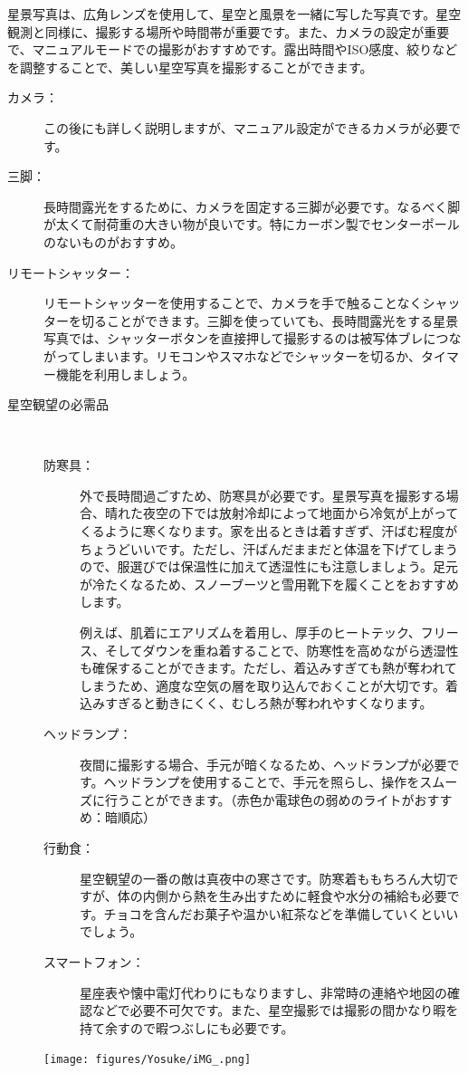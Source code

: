 \documentclass[../../super_nova_2023]{subfiles}
\begin{document}
星景写真は、広角レンズを使用して、星空と風景を一緒に写した写真です。星空観測と同様に、撮影する場所や時間帯が重要です。また、カメラの設定が重要で、マニュアルモードでの撮影がおすすめです。露出時間やISO感度、絞りなどを調整することで、美しい星空写真を撮影することができます。

\begin{tcolorbox}[title=星景写真に必要な物, breakable]
	\begin{description}
		\item[カメラ：]この後にも詳しく説明しますが、マニュアル設定ができるカメラが必要です。
		\item[三脚：]長時間露光をするために、カメラを固定する三脚が必要です。なるべく脚が太くて耐荷重の大きい物が良いです。特にカーボン製でセンターポールのないものがおすすめ。
		\item[リモートシャッター：]リモートシャッターを使用することで、カメラを手で触ることなくシャッターを切ることができます。三脚を使っていても、長時間露光をする星景写真では、シャッターボタンを直接押して撮影するのは被写体ブレにつながってしまいます。リモコンやスマホなどでシャッターを切るか、タイマー機能を利用しましょう。
		\item[星空観望の必需品] \mbox{}\\
			\begin{description}
				\item[防寒具：] 外で長時間過ごすため、防寒具が必要です。星景写真を撮影する場合、晴れた夜空の下では放射冷却によって地面から冷気が上がってくるように寒くなります。家を出るときは着すぎず、汗ばむ程度がちょうどいいです。ただし、汗ばんだままだと体温を下げてしまうので、服選びでは保温性に加えて透湿性にも注意しましょう。足元が冷たくなるため、スノーブーツと雪用靴下を履くことをおすすめします。\mbox{}\par
					例えば、肌着にエアリズムを着用し、厚手のヒートテック、フリース、そしてダウンを重ね着することで、防寒性を高めながら透湿性も確保することができます。ただし、着込みすぎても熱が奪われてしまうため、適度な空気の層を取り込んでおくことが大切です。着込みすぎると動きにくく、むしろ熱が奪われやすくなります。
				\item[ヘッドランプ：] 夜間に撮影する場合、手元が暗くなるため、ヘッドランプが必要です。ヘッドランプを使用することで、手元を照らし、操作をスムーズに行うことができます。（赤色か電球色の弱めのライトがおすすめ：暗順応）
				\item[行動食：] 星空観望の一番の敵は真夜中の寒さです。防寒着ももちろん大切ですが、体の内側から熱を生み出すために軽食や水分の補給も必要です。チョコを含んだお菓子や温かい紅茶などを準備していくといいでしょう。
				\item[スマートフォン：] 星座表や懐中電灯代わりにもなりますし、非常時の連絡や地図の確認などで必要不可欠です。また、星空撮影では撮影の間かなり暇を持て余すので暇つぶしにも必要です。
			\end{description}
			\centering
			\texttt{[image: figures/Yosuke/iMG\_.png]}
	\end{description}
\end{tcolorbox}
\end{document}
